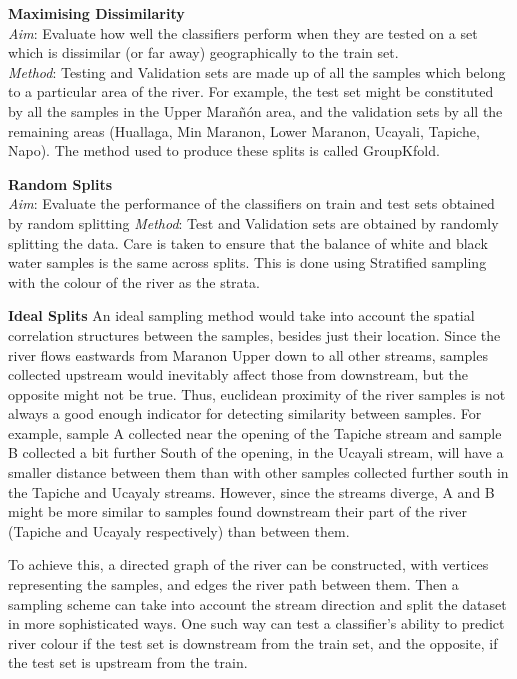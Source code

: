 { \large \bf Maximising Dissimilarity}\\
\textit{Aim}: Evaluate how well the classifiers perform when they are tested on a set which is dissimilar (or far away) geographically to the train set.\\
\textit{Method}: Testing and Validation sets are made up of all the samples which belong to a particular area of the river. For example, the test set might be constituted by all the samples in the Upper Marañón area, and the validation sets by all the remaining areas (Huallaga, Min Maranon, Lower Maranon, Ucayali, Tapiche, Napo). The method used to produce these splits is called GroupKfold.

{\large \bf Random Splits}\\
\textit{Aim}: Evaluate the performance of the classifiers on train and test sets obtained by random splitting
\textit{Method}: Test and Validation sets are obtained by randomly splitting the data. Care is taken to ensure that the balance of white and black water samples is the same across splits. This is done using Stratified sampling with the colour of the river as the strata.


{ \bf Ideal Splits}
An ideal sampling method would take into account the spatial correlation structures between the samples, besides just their location. Since the river flows eastwards from Maranon Upper down to all other streams, samples collected upstream would inevitably affect those from downstream, but the opposite might not be true. Thus, euclidean proximity of the river samples is not always a good enough indicator for detecting similarity between samples. For example, sample A collected near the opening of the Tapiche stream and sample B collected a bit further South of the opening, in the Ucayali stream, will have a smaller distance between them than with other samples collected further south in the Tapiche and Ucayaly streams. However, since the streams diverge, A and B might be more similar to samples found downstream their part of the river (Tapiche and Ucayaly respectively) than between them. 

To achieve this, a directed graph of the river can be constructed, with vertices representing the samples, and edges the river path between them. Then a sampling scheme can take into account the stream direction and split the dataset in more sophisticated ways. One such way can test a classifier's ability to predict river colour if the test set is downstream from the train set, and the opposite, if the test set is upstream from the train. 


